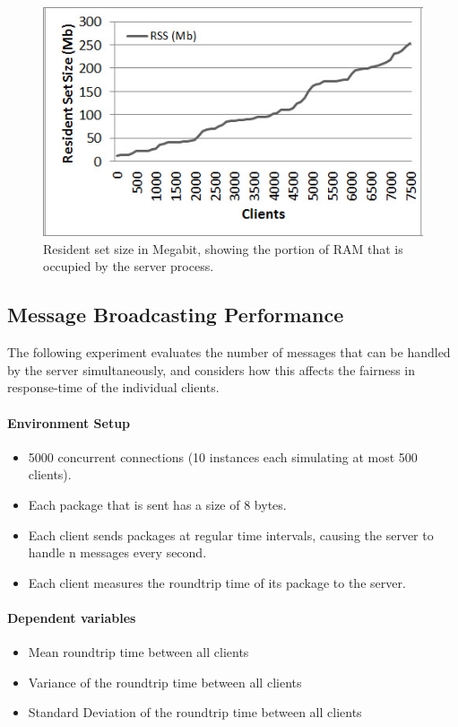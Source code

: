 \documentclass[bsc,frontabs,twoside,singlespacing,parskip,deptreport]{infthesis}     %
\begin{document}
\begin{center}
\begin{figure}
\centering
\includegraphics[scale=0.75]{images/test_CLIENT_RSS.jpg}
\caption{Resident set size in Megabit, showing the portion of RAM that is occupied by the server process.}
\label{fig:cpu_rss}
\end{figure}

\end{center}


\subsection{Message Broadcasting Performance}
The following experiment evaluates the number of messages that can be handled by the server simultaneously, and considers how this affects the fairness in response-time of the individual clients.

\paragraph*{Environment Setup}
\begin{itemize}
\item 5000 concurrent connections (10 instances each simulating at most 500 clients).
\item Each package that is sent has a size of 8 bytes.
\item Each client sends packages at regular time intervals, causing the server to handle n messages every second.
\item Each client measures the roundtrip time of its package to the server.
\end{itemize}

\paragraph*{Dependent variables}
\begin{itemize}
\item Mean roundtrip time between all clients
\item Variance of the roundtrip time between all clients
\item Standard Deviation of the roundtrip time between all clients
\end{itemize}
\end{document}

